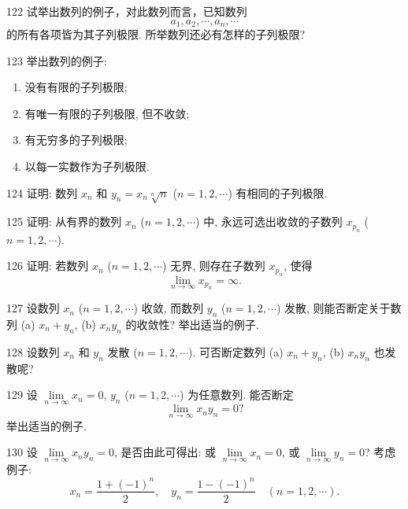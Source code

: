 \begin{prob}[M]{122}
试举出数列的例子，对此数列而言，已知数列
\[
a_1, a_2, \cdots, a_n, \cdots
\]
的所有各项皆为其子列极限. 所举数列还必有怎样的子列极限?
\end{prob}

\begin{prob}[L]{123}
举出数列的例子:
\begin{enumerate}[label=(\alph*), itemsep=2pt, topsep=3pt]
  \item 没有有限的子列极限;
  \item 有唯一有限的子列极限, 但不收敛;
  \item 有无穷多的子列极限;
  \item 以每一实数作为子列极限.
\end{enumerate}
\end{prob}

\begin{prob}[M]{124}
证明: 数列 $x_n$ 和 $y_n = x_n \sqrt[n]{n}$ ($n = 1, 2, \cdots$) 有相同的子列极限.
\end{prob}

\begin{prob}[M]{125}
证明: 从有界的数列 $x_n$ ($n = 1, 2, \cdots$) 中, 永远可选出收敛的子数列 $x_{p_n}$ ($n = 1, 2, \cdots$).
\end{prob}

\begin{prob}[M]{126}
证明: 若数列 $x_n$ ($n = 1, 2, \cdots$) 无界, 则存在子数列 $x_{p_n}$, 使得
\[
\lim_{n\to\infty} x_{p_n} = \infty.
\]
\end{prob}

\begin{prob}[M]{127}
设数列 $x_n$ ($n = 1, 2, \cdots$) 收敛, 而数列 $y_n$ ($n = 1, 2, \cdots$) 发散, 则能否断定关于数列 (a) $x_n + y_n$, (b) $x_n y_n$ 的收敛性? 举出适当的例子.
\end{prob}

\begin{prob}[M]{128}
设数列 $x_n$ 和 $y_n$ 发散 ($n = 1, 2, \cdots$). 可否断定数列 (a) $x_n + y_n$, (b) $x_n y_n$ 也发散呢?
\end{prob}

\begin{prob}[M]{129}
设 $\lim\limits_{n\to\infty} x_n = 0$, $y_n$ ($n = 1, 2, \cdots$) 为任意数列. 能否断定
\[
\lim_{n\to\infty} x_n y_n = 0?
\]
举出适当的例子.
\end{prob}

\begin{prob}[M]{130}
设 $\lim\limits_{n\to\infty} x_n y_n = 0$, 是否由此可得出: 或 $\lim\limits_{n\to\infty} x_n = 0$, 或 $\lim\limits_{n\to\infty} y_n = 0$? 考虑例子:
\[
x_n = \frac{1 + (-1)^n}{2}, \quad y_n = \frac{1 - (-1)^n}{2} \quad (n = 1, 2, \cdots).
\]
\end{prob}

